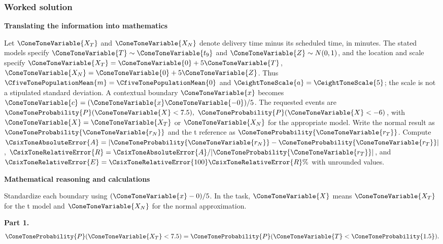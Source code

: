 \subsubsection*{Worked solution}\label{sol:c9-d1}
\par\textbf{Translating the information into mathematics}\par
Let $\ConeToneVariable{X_T}$ and $\ConeToneVariable{X_N}$ denote delivery time minus its scheduled time, in minutes. The stated models specify $\ConeToneVariable{T}\sim \ConeToneVariable{t_{9}}$ and $\ConeToneVariable{Z}\sim N(0,1)$, and the location and scale specify $\ConeToneVariable{X_T}=\ConeToneVariable{0}+5\ConeToneVariable{T}$, $\ConeToneVariable{X_N}=\ConeToneVariable{0}+5\ConeToneVariable{Z}$. Thus $\CfiveTonePopulationMean{m}=\CfiveTonePopulationMean{0}$ and $\CeightToneScale{a}=\CeightToneScale{5}$; the scale is not a stipulated standard deviation. A contextual boundary $\ConeToneVariable{x}$ becomes $\ConeToneVariable{c}=(\ConeToneVariable{x}\ConeToneVariable{-0})/5$. The requested events are $\ConeToneProbability{P}(\ConeToneVariable{X}<7.5),\ \ConeToneProbability{P}(\ConeToneVariable{X}<-6)$, with $\ConeToneVariable{X}=\ConeToneVariable{X_T}$ or $\ConeToneVariable{X_N}$ for the appropriate model. Write the normal result as $\ConeToneProbability{\ConeToneVariable{r_N}}$ and the t reference as $\ConeToneProbability{\ConeToneVariable{r_T}}$. Compute $\CsixToneAbsoluteError{A}=|\ConeToneProbability{\ConeToneVariable{r_N}}-\ConeToneProbability{\ConeToneVariable{r_T}}|$, $\CsixToneRelativeError{R}=\CsixToneAbsoluteError{A}/|\ConeToneProbability{\ConeToneVariable{r_T}}|$, and $\CsixToneRelativeError{E}=\CsixToneRelativeError{100}\CsixToneRelativeError{R}\%$ with unrounded values.
\par\textbf{Mathematical reasoning and calculations}\par
Standardize each boundary using $(\ConeToneVariable{x}-0)/5$. In the task, $\ConeToneVariable{X}$ means $\ConeToneVariable{X_T}$ for the t model and $\ConeToneVariable{X_N}$ for the normal approximation.
\par\textbf{Part 1.}\[\ConeToneProbability{P}(\ConeToneVariable{X_T}<7.5)=\ConeToneProbability{P}(\ConeToneVariable{T}<\ConeToneProbability{1.5}).\]
